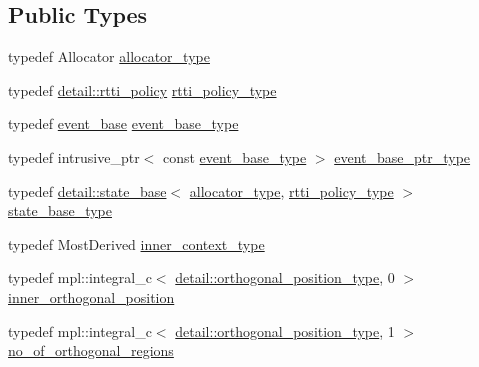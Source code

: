 \subsection*{Public Types}
\begin{DoxyCompactItemize}
\item 
typedef Allocator \mbox{\hyperlink{classboost_1_1statechart_1_1state__machine_a7345d6567cd1a829234bbb7f6c0715da}{allocator\+\_\+type}}
\item 
typedef \mbox{\hyperlink{structboost_1_1statechart_1_1detail_1_1rtti__policy}{detail\+::rtti\+\_\+policy}} \mbox{\hyperlink{classboost_1_1statechart_1_1state__machine_af2a620c579a5248103aee4d3ccb4d632}{rtti\+\_\+policy\+\_\+type}}
\item 
typedef \mbox{\hyperlink{classboost_1_1statechart_1_1event__base}{event\+\_\+base}} \mbox{\hyperlink{classboost_1_1statechart_1_1state__machine_adb0e98d6d780a0977209fa7389b20bcd}{event\+\_\+base\+\_\+type}}
\item 
typedef intrusive\+\_\+ptr$<$ const \mbox{\hyperlink{classboost_1_1statechart_1_1state__machine_adb0e98d6d780a0977209fa7389b20bcd}{event\+\_\+base\+\_\+type}} $>$ \mbox{\hyperlink{classboost_1_1statechart_1_1state__machine_aa2f1c567e2d1a66786d28769312dfa08}{event\+\_\+base\+\_\+ptr\+\_\+type}}
\item 
typedef \mbox{\hyperlink{classboost_1_1statechart_1_1detail_1_1state__base}{detail\+::state\+\_\+base}}$<$ \mbox{\hyperlink{classboost_1_1statechart_1_1state__machine_a7345d6567cd1a829234bbb7f6c0715da}{allocator\+\_\+type}}, \mbox{\hyperlink{classboost_1_1statechart_1_1state__machine_af2a620c579a5248103aee4d3ccb4d632}{rtti\+\_\+policy\+\_\+type}} $>$ \mbox{\hyperlink{classboost_1_1statechart_1_1state__machine_a69cc258c29fcabec25c5dc8bedb7d530}{state\+\_\+base\+\_\+type}}
\item 
typedef Most\+Derived \mbox{\hyperlink{classboost_1_1statechart_1_1state__machine_ae051793d49b601dad268a2d1c35c613f}{inner\+\_\+context\+\_\+type}}
\item 
typedef mpl\+::integral\+\_\+c$<$ \mbox{\hyperlink{namespaceboost_1_1statechart_1_1detail_a3bedea0b807a16fa222733417183d2c9}{detail\+::orthogonal\+\_\+position\+\_\+type}}, 0 $>$ \mbox{\hyperlink{classboost_1_1statechart_1_1state__machine_afaec7011d17371269ebbe87e25273d0b}{inner\+\_\+orthogonal\+\_\+position}}
\item 
typedef mpl\+::integral\+\_\+c$<$ \mbox{\hyperlink{namespaceboost_1_1statechart_1_1detail_a3bedea0b807a16fa222733417183d2c9}{detail\+::orthogonal\+\_\+position\+\_\+type}}, 1 $>$ \mbox{\hyperlink{classboost_1_1statechart_1_1state__machine_ae7f178d74dedd129cd88adffc0f63092}{no\+\_\+of\+\_\+orthogonal\+\_\+regions}}

\end{DoxyCompactItemize}
